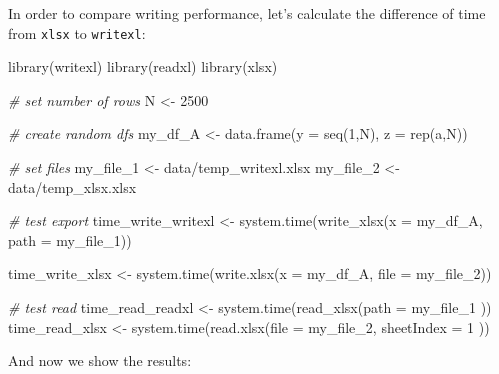 \documentclass[
  12pt,
]{book}
\newenvironment{Shaded}{\begin{snugshade}}{\end{snugshade}}
\newcommand{\AttributeTok}[1]{\textcolor[rgb]{0.61,0.61,0.61}{#1}}
\newcommand{\CommentTok}[1]{\textcolor[rgb]{0.37,0.37,0.37}{\textit{#1}}}
\newcommand{\DecValTok}[1]{\textcolor[rgb]{0.06,0.06,0.06}{#1}}
\newcommand{\FunctionTok}[1]{\textcolor[rgb]{0,0,0}{#1}}
\newcommand{\NormalTok}[1]{#1}
\newcommand{\OtherTok}[1]{\textcolor[rgb]{0.37,0.37,0.37}{#1}}
\newcommand{\StringTok}[1]{\textcolor[rgb]{0.5,0.5,0.5}{#1}}
\begin{document}
In order to compare writing performance, let's calculate the difference of time from \texttt{xlsx} to \texttt{writexl}:

\begin{Shaded}
\begin{Highlighting}[]
\FunctionTok{library}\NormalTok{(writexl)}
\FunctionTok{library}\NormalTok{(readxl)}
\FunctionTok{library}\NormalTok{(xlsx)}

\CommentTok{\# set number of rows}
\NormalTok{N }\OtherTok{\textless{}{-}} \DecValTok{2500}

\CommentTok{\# create random dfs}
\NormalTok{my\_df\_A }\OtherTok{\textless{}{-}} \FunctionTok{data.frame}\NormalTok{(}\AttributeTok{y =} \FunctionTok{seq}\NormalTok{(}\DecValTok{1}\NormalTok{,N),}
                      \AttributeTok{z =} \FunctionTok{rep}\NormalTok{(}\StringTok{\textquotesingle{}a\textquotesingle{}}\NormalTok{,N))}

\CommentTok{\# set files}
\NormalTok{my\_file\_1 }\OtherTok{\textless{}{-}} \StringTok{\textquotesingle{}data/temp\_writexl.xlsx\textquotesingle{}}
\NormalTok{my\_file\_2 }\OtherTok{\textless{}{-}} \StringTok{\textquotesingle{}data/temp\_xlsx.xlsx\textquotesingle{}}

\CommentTok{\# test export}
\NormalTok{time\_write\_writexl }\OtherTok{\textless{}{-}} \FunctionTok{system.time}\NormalTok{(}\FunctionTok{write\_xlsx}\NormalTok{(}\AttributeTok{x =}\NormalTok{ my\_df\_A,}
                                             \AttributeTok{path =}\NormalTok{ my\_file\_1))}

\NormalTok{time\_write\_xlsx }\OtherTok{\textless{}{-}} \FunctionTok{system.time}\NormalTok{(}\FunctionTok{write.xlsx}\NormalTok{(}\AttributeTok{x =}\NormalTok{ my\_df\_A,}
                                          \AttributeTok{file =}\NormalTok{ my\_file\_2))}

\CommentTok{\# test read}
\NormalTok{time\_read\_readxl }\OtherTok{\textless{}{-}} \FunctionTok{system.time}\NormalTok{(}\FunctionTok{read\_xlsx}\NormalTok{(}\AttributeTok{path =}\NormalTok{ my\_file\_1 ))}
\NormalTok{time\_read\_xlsx }\OtherTok{\textless{}{-}} \FunctionTok{system.time}\NormalTok{(}\FunctionTok{read.xlsx}\NormalTok{(}\AttributeTok{file =}\NormalTok{ my\_file\_2,}
                                        \AttributeTok{sheetIndex =} \DecValTok{1}\NormalTok{ ))}
\end{Highlighting}
\end{Shaded}

And now we show the results:
\end{document}
